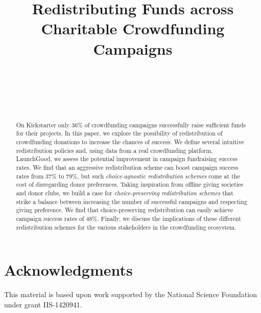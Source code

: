 \documentclass{sigchi}
\newcommand{\lag}{{LaunchGood}\xspace}
\newcommand{\cpr}{{choice-preserving redistribution}\xspace}
\newcommand{\car}{{choice-agnostic redistribution}\xspace}
\begin{document}

\title{Redistributing Funds across Charitable Crowdfunding Campaigns}

\author{%
 \\
 \\
    \\
    \\
}


\maketitle

\begin{abstract}

On Kickstarter only 36\% of crowdfunding campaigns successfully raise sufficient funds for their projects. In this paper, we explore the possibility of redistribution of crowdfunding donations to increase the chances of success. We define several intuitive redistribution policies and, using data from a real crowdfunding platform, \lag, we assess the potential improvement in campaign fundraising success rates. We find that an aggressive redistribution scheme can boost campaign success rates from 37\% to 79\%, but such \textit{\car schemes} come at the cost of disregarding donor preferences. Taking inspiration from offline giving societies and donor clubs, we build a case for \textit{\cpr schemes} that strike a balance between increasing the number of successful campaigns and respecting giving preference. We find that \cpr can easily achieve campaign success rates of 48\%. Finally, we discuss the implications of these different redistribution schemes for the various stakeholders in the crowdfunding ecosystem.

\end{abstract}










\section{Acknowledgments}
This material is based upon work supported by the National Science Foundation under grant IIS-1420941.


\balance{}




\end{document}
